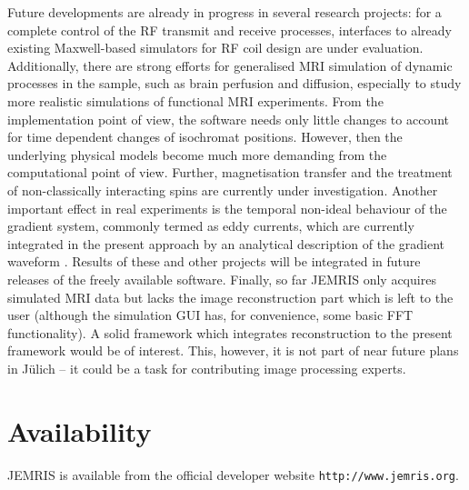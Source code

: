\documentclass[journal,onecolumn,12pt]{IEEEtran}
\begin{document}
Future developments are already in progress in several research projects: for a complete control of the RF transmit and
receive processes, interfaces to already existing Maxwell-based simulators for RF coil design are under
evaluation. Additionally, there are strong efforts for generalised MRI simulation of dynamic processes in the sample,
such as brain perfusion and diffusion, especially to study more realistic simulations of functional MRI
experiments. From the implementation point of view, the software needs only little changes to account for time dependent
changes of isochromat positions. However, then the underlying physical models become much more demanding from the
computational point of view. Further, magnetisation transfer and the treatment of non-classically interacting spins are
currently under investigation. Another important effect in real experiments is the temporal non-ideal behaviour of the
gradient system, commonly termed as eddy currents, which are currently integrated in the present approach by an
analytical description of the gradient waveform \cite{barker}. Results of these and other projects will be integrated in
future releases of the freely available software. Finally, so far JEMRIS only acquires simulated MRI data but lacks the
image reconstruction part which is left to the user (although the simulation GUI has, for convenience, some basic FFT
functionality). A solid framework which integrates reconstruction to the present framework would be of interest.
This, however, it is not part of near future plans in J\"ulich -- it could be a task for contributing image processing
experts.

\section*{Availability}
JEMRIS is available from the official developer website \verb+http://www.jemris.org+.


\end{document}

